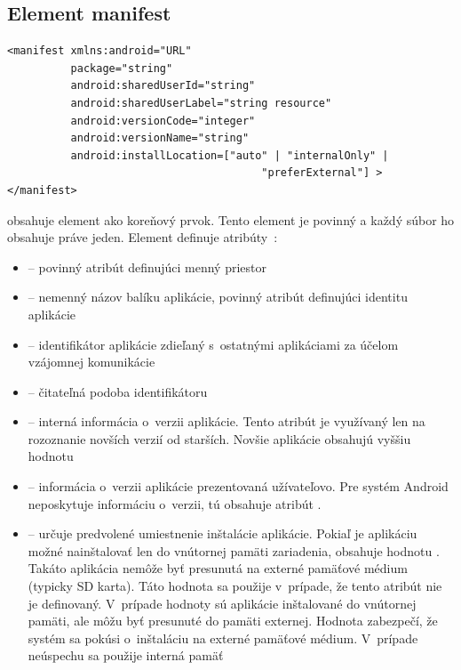 \subsection{Element manifest}
\label{el_manifest}
\lstset{language=XML}
\begin{lstlisting}
<manifest xmlns:android="URL"
          package="string"
          android:sharedUserId="string"
          android:sharedUserLabel="string resource"
          android:versionCode="integer"
          android:versionName="string"
          android:installLocation=["auto" | "internalOnly" |
                                        "preferExternal"] >
</manifest>
\end{lstlisting}
 obsahuje element  ako koreňový prvok. Tento element je povinný a každý súbor  ho obsahuje práve jeden. \newline\newline
\noindent Element  definuje atribúty~\cite{elManifest}:\\
\begin{itemize}
\item {} -- povinný atribút definujúci menný priestor
\item {} -- nemenný názov balíku aplikácie, povinný atribút definujúci identitu aplikácie
\item {} -- identifikátor aplikácie zdieľaný s~ostatnými aplikáciami za účelom vzájomnej komunikácie
\item {} -- čitateľná podoba  identifikátoru
\item {} -- interná informácia o~verzii aplikácie. Tento atribút je využívaný len na rozoznanie novších verzií od starších. Novšie aplikácie obsahujú vyššiu hodnotu
\item {} – informácia o~verzii aplikácie prezentovaná užívateľovo. Pre systém Android neposkytuje informáciu o~verzii, tú obsahuje atribút .
\item {} – určuje predvolené umiestnenie inštalácie aplikácie. Pokiaľ je aplikáciu možné nainštalovať len do vnútornej pamäti zariadenia, obsahuje hodnotu . Takáto aplikácia nemôže byť presunutá na externé pamäťové médium (typicky SD karta). Táto hodnota sa použije v~prípade, že tento atribút nie je definovaný. V~prípade hodnoty  sú aplikácie inštalované do vnútornej pamäti, ale môžu byť presunuté do pamäti externej. Hodnota  zabezpečí, že systém sa pokúsi o~inštaláciu na externé pamäťové médium. V~prípade neúspechu sa použije interná pamäť
\end{itemize}

